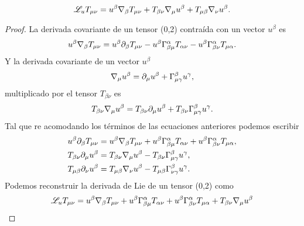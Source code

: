 \begin{equation}
    \mathscr{L}_u T_{\mu \nu} = u^\beta \mathbf{\nabla}_\beta T_{\mu \nu}+T_{\beta \nu}\mathbf{\nabla}_\mu u^\beta +T_{\mu \beta } \mathbf{\nabla}_\nu u^\beta.
\end{equation}

\begin{proof}
  
 La derivada covariante de un tensor (0,2) contraída con un vector $u^\beta$ es
 \begin{equation}
     u^\beta \mathbf{\nabla}_\beta T_{\mu \nu} = u^\beta \partial_\beta T_{\mu \nu} - u^\beta \Gamma_{\beta \mu}^\alpha T_{\alpha \nu} - u^\beta \Gamma_{\beta \nu}^\alpha T_{\mu \alpha}.
 \end{equation}
 Y la derivada covariante de un vector $u^\beta$ 
 \begin{equation}
     \mathbf{\nabla}_\mu u^\beta =  \partial_\mu u^\beta + \Gamma^\beta_{\mu \gamma} u^\gamma,
 \end{equation}
 multiplicado por el tensor $T_{\beta \nu}$ es
 \begin{equation}
     T_{\beta \nu}\mathbf{\nabla}_\mu u^\beta =  T_{\beta \nu}\partial_\mu u^\beta +T_{\beta \nu}\Gamma^\beta_{\mu \gamma} u^\gamma.
 \end{equation}
 Tal que re acomodando los términos de las ecuaciones anteriores podemos escribir
 \begin{equation}
     \begin{aligned}
         u^\beta \partial_\beta T_{\mu \nu}      & = u^\beta \mathbf{\nabla}_\beta T_{\mu \nu} +u^\beta \Gamma_{\beta \mu}^\alpha T_{\alpha \nu} + u^\beta \Gamma_{\beta \nu}^\alpha T_{\mu \alpha}, \\
         T_{\beta \nu}\partial_\mu u^\beta   & = T_{\beta \nu}\mathbf{\nabla}_\mu u^\beta - T_{\beta \nu}\Gamma^\beta_{\mu \gamma} u^\gamma                                                 , \\
         T_{\mu \beta } \partial_\nu u^\beta & = T_{\mu \beta } \mathbf{\nabla}_\nu u^\beta -  T_{\mu \beta } \Gamma^\beta_{\nu \gamma} u^\gamma.
     \end{aligned}
 \end{equation}
 Podemos reconstruir la derivada de Lie de un tensor (0,2) como
 \begin{equation}
     \begin{aligned}
         \mathscr{L}_u T_{\mu \nu} & = u^\beta \v{\nabla}_\beta T_{\mu \nu} +u^\beta \Gamma_{\beta \mu}^\alpha T_{\alpha \nu} + u^\beta \Gamma_{\beta \nu}^\alpha T_{\mu \alpha} + T_{\beta \nu}\v{\nabla}_\mu u^\beta \\

\end{aligned}
\end{equation}
\end{proof}
